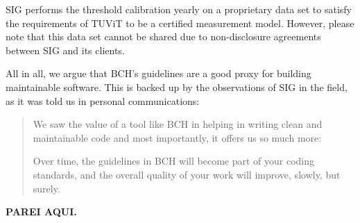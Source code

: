 \documentclass[11pt,fleqn]{article}
\begin{document}
SIG performs the threshold calibration
yearly on a proprietary data set to satisfy the requirements of TUViT to
be a certified measurement model. However, please note that this data set 
cannot be shared due to non-disclosure agreements between SIG and its 
clients.

All in all, we argue that BCH's guidelines are a good proxy for building maintainable software. This is 
backed up by the observations of SIG in the field, as it was told us in personal communications: 

\begin{quote}
We saw the value of a tool like BCH in helping in writing clean and maintainable code and most importantly, 
it offers us so much more:

Over time, the guidelines in BCH will become part of your coding standards, and the overall quality of your 
work will improve, slowly, but surely.
\end{quote}


\textbf{PAREI AQUI.}


\end{document}
